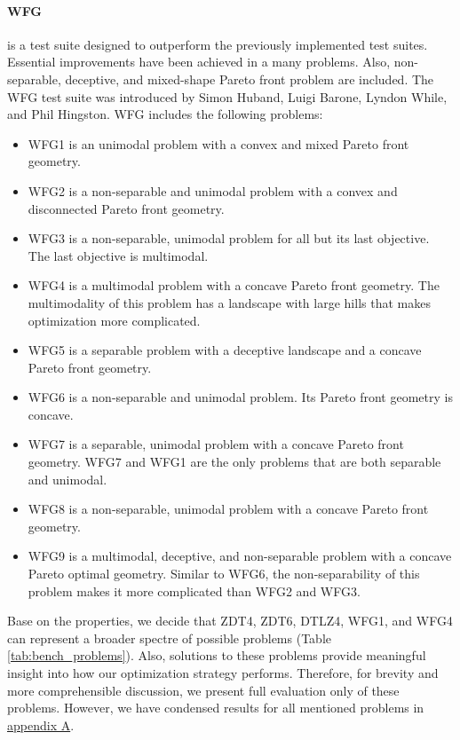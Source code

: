         \paragraph{WFG}\cite{WFGref} is a test suite designed to outperform the previously implemented test suites. Essential improvements have been achieved in a many problems. Also, non-separable, deceptive, and mixed-shape Pareto front problem are included. The WFG test suite was introduced by Simon Huband, Luigi Barone, Lyndon While, and Phil Hingston. 
        WFG includes the following problems:
        \begin{itemize}
            \item WFG1 is an unimodal problem with a convex and mixed Pareto front geometry. 
            \item WFG2 is a non-separable and unimodal problem with a convex and disconnected Pareto front geometry.
            \item WFG3 is a non-separable, unimodal problem for all but its last objective. The last objective is multimodal.
            \item WFG4 is a multimodal problem with a concave Pareto front geometry. The multimodality of this problem has a landscape with large hills that makes optimization more complicated.
            \item WFG5 is a separable problem with a deceptive landscape and a concave Pareto front geometry.
            \item WFG6 is a non-separable and unimodal problem. Its Pareto front geometry is concave. 
            \item WFG7 is a separable, unimodal problem with a concave Pareto front geometry. WFG7 and WFG1 are the only problems that are both separable and unimodal.
            \item WFG8 is a non-separable, unimodal problem with a concave Pareto front geometry.
            \item WFG9 is a multimodal, deceptive, and non-separable problem with a concave Pareto optimal geometry. Similar to WFG6, the non-separability of this problem makes it more complicated than WFG2 and WFG3.
        \end{itemize}


        Base on the properties, we decide that ZDT4, ZDT6, DTLZ4, WFG1, and WFG4 can represent a broader spectre of possible problems (Table \ref{tab:bench_problems}). Also, solutions to these problems provide meaningful insight into how our optimization strategy performs. Therefore, for brevity and more comprehensible discussion, we present full evaluation only of these problems. However, we have condensed results for all mentioned problems in \hyperref[sec:appendix-a]{appendix A}.

